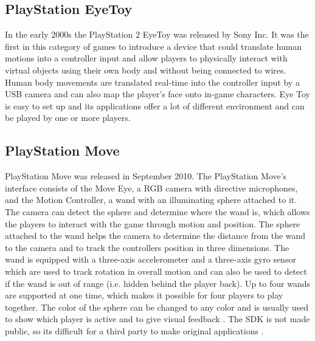 \subsection{PlayStation EyeToy}
In the early 2000s the PlayStation 2 EyeToy was released by Sony Inc. It was the first in this category of games to introduce a device that could translate human motions into a controller input and allow players to physically interact with virtual objects using their own body and without being connected to wires. Human body movements are translated real-time into the controller input by a USB camera  and can also map the player’s face onto in-game characters. Eye Toy is easy to set up and its applications offer a lot of different environment and can be played by one or more players. \cite{eyetoy}

\subsection{PlayStation Move}
PlayStation Move was released in September 2010. The PlayStation Move’s interface consists of the Move Eye, a RGB camera with directive microphones, and the Motion Controller, a wand with an illuminating sphere attached to it. The camera can detect the sphere and determine where the wand is, which allows the players to interact with the game through motion and position. The sphere attached to the wand helps the camera to determine the distance from the wand to the camera and to track the controllers position in three dimensions. The wand is equipped with a three-axis accelerometer and a three-axis gyro sensor which are used to track rotation in overall motion and can also be used to detect if the wand is out of range (i.e. hidden behind the player back). \cite{comparison} Up to four wands are supported at one time, which makes it possible for four players to play together. The color of the sphere can be changed to any color and is usually used to show which player is active and to give visual feedback \cite{ppmove}. The SDK is not made public, so its difficult for a third party to make original applications \cite{comparison}. 

